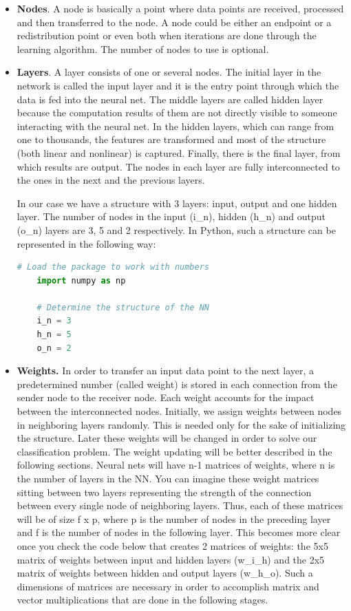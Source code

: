 \begin{itemize}
    \item \textbf{Nodes}. A node is basically a point where data points are received, processed and then transferred to the node. A node could be either an endpoint or a redistribution point or even both when iterations are done through the learning algorithm. The number of nodes to use is optional.

    \item \textbf{Layers}. A layer consists of one or several nodes. The initial layer in the network is called the input layer and it is the entry point through which the data is fed into the neural net. The middle layers are called hidden layer because the computation results of them are not directly visible to someone interacting with the neural net. In the hidden layers, which can range from one to thousands, the features are transformed and most of the structure (both linear and nonlinear) is captured. Finally, there is the final layer, from which results are output. The nodes in each layer are fully interconnected to the ones in the next and the previous layers. 


In our case we have a structure with 3 layers: input, output and one hidden layer. The number of nodes in the input  (i\_n), hidden (h\_n) and output (o\_n) layers are 3, 5 and 2 respectively. In Python, such a structure can be represented in the following way:

\begin{lstlisting}[language=Python]
    # Load the package to work with numbers
    import numpy as np
    
    # Determine the structure of the NN
    i_n = 3
    h_n = 5
    o_n = 2
\end{lstlisting}

    \item \textbf{Weights.} In order to transfer an input data point to the next layer, a predetermined number (called weight) is stored in each connection from the sender node to the receiver node. Each weight accounts for the impact between the interconnected nodes. Initially, we assign weights between nodes in neighboring layers randomly. This is needed only for the sake of initializing the structure. Later these weights will be changed in order to solve our classification problem. The weight updating will be better described in the following sections. Neural nets will have n-1 matrices of weights, where n is the number of layers in the NN. You can imagine these weight matrices sitting between two layers representing the strength of the connection between every single node of neighboring layers. Thus, each of these matrices will be of size f x p, where p is the number of nodes in the preceding layer and f is the number of nodes in the following layer.
    This becomes more clear once you check the code below that creates 2 matrices of weights: the 5x5 matrix of weights between input and hidden layers (w\_i\_h) and the 2x5 matrix of weights between hidden and output layers (w\_h\_o). Such a dimensions of matrices are necessary in order to accomplish matrix and vector multiplications that are done in the following stages.


\end{itemize}

